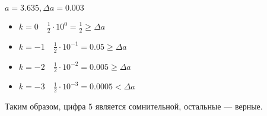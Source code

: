 \documentclass[12pt, a4paper, oneside]{book}
\begin{document}
\begin{example}
    \(a = 3.635, \Delta a = 0.003\)
    \begin{itemize}
        \item \(k = 0 \quad \frac{1}{2} \cdot 10^0 = \frac{1}{2} \geq \Delta a\)
        \item \(k = - 1 \quad \frac{1}{2} \cdot 10^{ - 1} = 0.05 \geq \Delta a\)
        \item \(k = - 2 \quad \frac{1}{2} \cdot 10^{ - 2} = 0.005 \geq \Delta a\)
        \item \(k = - 3 \quad \frac{1}{2} \cdot 10^{ - 3} = 0.0005 < \Delta a\)
    \end{itemize}

    Таким образом, цифра \(5\) является сомнительной, остальные --- верные.
\end{example}
\end{document}
